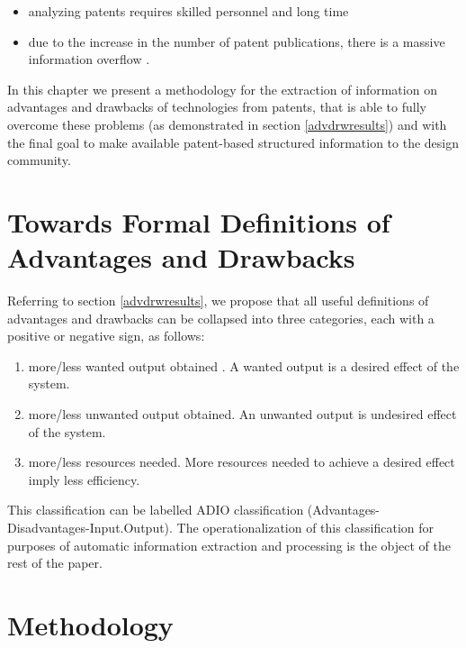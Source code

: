 \documentclass[]{book}
\providecommand{\tightlist}{%
  \setlength{\itemsep}{0pt}\setlength{\parskip}{0pt}}
\theoremstyle{definition}
\theoremstyle{definition}
\theoremstyle{definition}
\theoremstyle{remark}
\begin{document}
\begin{itemize}
\tightlist
\item
  analyzing patents requires skilled personnel and long time
  \citep{leon2007trends}
\item
  due to the increase in the number of patent publications, there is a
  massive information overflow \citep{bergmann2008evaluating}.
\end{itemize}

In this chapter we present a methodology for the extraction of
information on advantages and drawbacks of technologies from patents,
that is able to fully overcome these problems (as demonstrated in
section \ref{advdrwresults}) and with the final goal to make available
patent-based structured information to the design community.

\section{Towards Formal Definitions of Advantages and
Drawbacks}\label{towards-formal-definitions-of-advantages-and-drawbacks}

Referring to section \ref{advdrwresults}, we propose that all useful
definitions of advantages and drawbacks can be collapsed into three
categories, each with a positive or negative sign, as follows:

\begin{enumerate}
\def\labelenumi{\arabic{enumi}.}
\tightlist
\item
  more/less wanted output obtained . A wanted output is a desired effect
  of the system.
\item
  more/less unwanted output obtained. An unwanted output is undesired
  effect of the system.
\item
  more/less resources needed. More resources needed to achieve a desired
  effect imply less efficiency.
\end{enumerate}

This classification can be labelled ADIO classification
(Advantages-Disadvantages-Input.Output). The operationalization of this
classification for purposes of automatic information extraction and
processing is the object of the rest of the paper.

\section{Methodology}\label{methodology-9}
\end{document}
